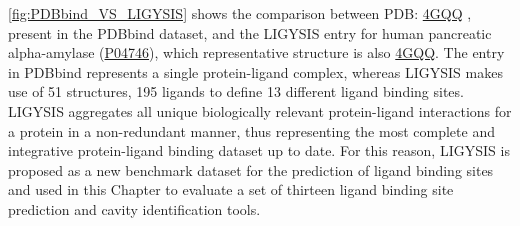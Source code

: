 \autoref{fig:PDBbind_VS_LIGYSIS} shows the comparison between PDB: \href{https://www.ebi.ac.uk/pdbe/entry/pdb/4GQQ}{4GQQ} \cite{WILLIAMS_2012_AMYLASE}, present in the PDBbind dataset, and the LIGYSIS entry for human pancreatic alpha-amylase (\href{https://www.uniprot.org/uniprotkb/P04746/entry}{P04746}), which representative structure is also \href{https://www.ebi.ac.uk/pdbe/entry/pdb/4GQQ}{4GQQ}. The entry in PDBbind represents a single protein-ligand complex, whereas LIGYSIS makes use of 51 structures, 195 ligands to define 13 different ligand binding sites. LIGYSIS aggregates all unique biologically relevant protein-ligand interactions for a protein in a non-redundant manner, thus representing the most complete and integrative protein-ligand binding dataset up to date. For this reason, LIGYSIS is proposed as a new benchmark dataset for the prediction of ligand binding sites and used in this Chapter to evaluate a set of thirteen ligand binding site prediction and cavity identification tools.

